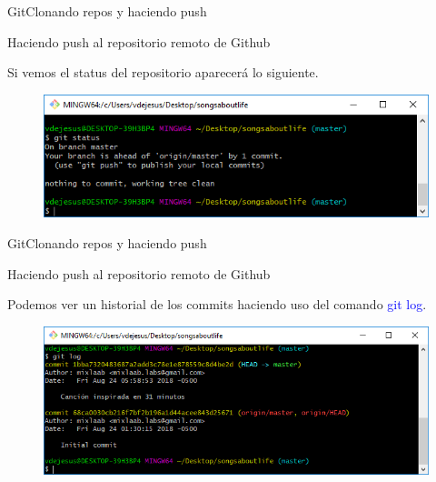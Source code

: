 \documentclass[10pt]{beamer}
\begin{document}
\begin{frame}{Git}{Clonando repos y haciendo push}

\begin{block}{Haciendo push al repositorio remoto de Github}

Si vemos el status del repositorio aparecerá lo siguiente.

\begin{figure}[h!]
\centering
\includegraphics [scale=0.6]{gitstatus3}
\label{fig:gitstatus3}
\end{figure}

\end{block}

\end{frame}

\begin{frame}{Git}{Clonando repos y haciendo push}

\begin{block}{Haciendo push al repositorio remoto de Github}

Podemos ver un historial de los commits haciendo uso del comando \textcolor{blue}{git log}.

\begin{figure}[h!]
\centering
\includegraphics [scale=0.55]{gitlog}
\label{fig:gitlog}
\end{figure}

\end{block}

\end{frame}
\end{document}
